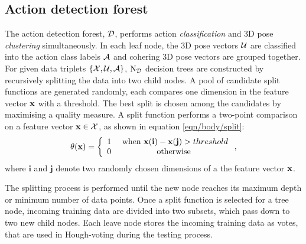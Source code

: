 \subsection{Action detection forest}
\label{sec/body/adflearn}
The action detection forest, $\mathcal{D}$, performs action \emph{classification} and 3D pose \emph{clustering} simultaneously.  
In each leaf node, the 3D pose vectors $\mathcal{U}$ are classified into the action class labels $\mathcal{A}$ and cohering 3D pose vectors are grouped together.
For given data triplets $\{\mathcal{X},\mathcal{U}, \mathcal{A}\}$, $\mathrm{N_{\mathcal{D}}}$ decision trees are constructed by recursively splitting the data into two child nodes. 
A pool of candidate split functions are generated randomly, each compares one dimension in the feature vector $\mathbf{x}$ with a threshold. 
The best split is chosen among the candidates by maximising a quality measure. 
A split function performs a two-point comparison on a feature vector $\mathbf{x} \in \mathcal{X}$, as shown in equation \ref{eqn/body/split}: 
\begin{equation}
	\theta(\mathbf{x}) = 
	\left\{
		\begin{array}{lc} 
			1 & \mbox{ when } \mathbf{x}(\mathbf{i}) - \mathbf{x}(\mathbf{j}) > threshold \\  
			0 & \mbox{ otherwise } 
		\end{array}
	\right.,
	\label{eqn/body/split}
\end{equation}
where $\mathbf{i}$ and $\mathbf{j}$ denote two randomly chosen dimensions of a the feature vector $\mathbf{x}$. 

The splitting process is performed until the new node reaches its maximum depth or minimum number of data points. 
Once a split function is selected for a tree node, incoming training data are divided into two subsets, which pass down to two new child nodes.  
Each leave node stores the incoming training data as votes, that are used in Hough-voting during the testing process. 

